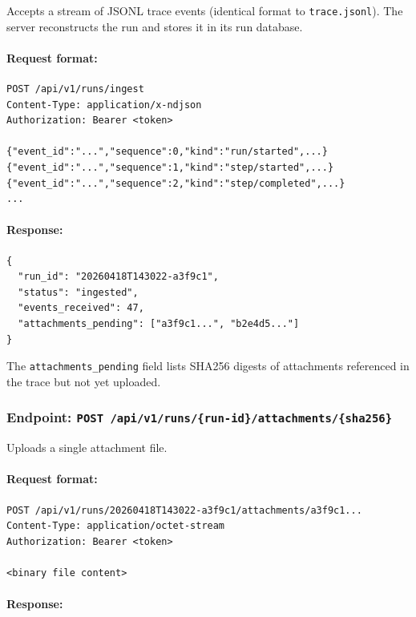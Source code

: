 Accepts a stream of JSONL trace events (identical format to \texttt{trace.jsonl}). The server reconstructs the run and stores it in its run database.

\paragraph{Request format:}

\begin{verbatim}
POST /api/v1/runs/ingest
Content-Type: application/x-ndjson
Authorization: Bearer <token>

{"event_id":"...","sequence":0,"kind":"run/started",...}
{"event_id":"...","sequence":1,"kind":"step/started",...}
{"event_id":"...","sequence":2,"kind":"step/completed",...}
...
\end{verbatim}

\paragraph{Response:}

\begin{verbatim}
{
  "run_id": "20260418T143022-a3f9c1",
  "status": "ingested",
  "events_received": 47,
  "attachments_pending": ["a3f9c1...", "b2e4d5..."]
}
\end{verbatim}

The \texttt{attachments\_pending} field lists SHA256 digests of attachments referenced in the trace but not yet uploaded.

\subsubsection{Endpoint: \texttt{POST /api/v1/runs/\{run-id\}/attachments/\{sha256\}}}

Uploads a single attachment file.

\paragraph{Request format:}

\begin{verbatim}
POST /api/v1/runs/20260418T143022-a3f9c1/attachments/a3f9c1...
Content-Type: application/octet-stream
Authorization: Bearer <token>

<binary file content>
\end{verbatim}

\paragraph{Response:}


